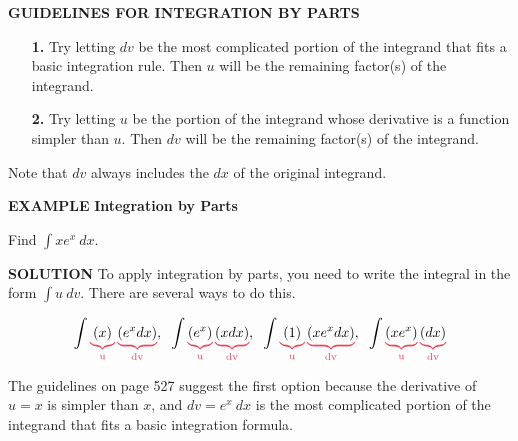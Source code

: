 \documentclass[oneside]{book}
\begin{document}
\sffamily
\begin{tcolorbox}[colback = beige!75!white,
				  sharp corners = all,
				  colframe = beige!75!white]
\textbf{GUIDELINES FOR INTEGRATION BY PARTS}
\rmfamily
\begin{enumerate}
\item[\textbf{1.}] Try letting $dv$ be the most complicated portion of the integrand that fits a basic integration rule. Then $u$ will be the remaining factor(s) of the integrand.

\item[\textbf{2.}] Try letting $u$ be the portion of the integrand whose derivative is a function simpler than $u$. Then $dv$ will be the remaining factor(s) of the integrand.
\end{enumerate}

\noindent Note that $dv$ always includes the $dx$ of the original integrand. 
\end{tcolorbox}

\bigskip

\noindent \color{myblue} \large \textbf{EXAMPLE} \color{black} \normalsize \textbf{Integration by Parts}
\rmfamily

\bigskip

\noindent Find $ \displaystyle \int xe^x \ dx$.
\sffamily

\bigskip

\noindent \color{myblue} \textbf{SOLUTION} \color{black} \rmfamily \hspace{.3cm}To apply integration by parts, you need to write the integral in the form $\int u \ dv$. There are several ways to do this.

$$ \int \color{mypink}\underbrace{\color{black}(x)}_\text{u} \color{mypink}\underbrace{\color{black}(e^x dx)}_\text{dv}\color{black}, 
\hspace{.2cm} \int \color{mypink}\underbrace{\color{black}(e^x)}_\text{u} \color{mypink}\underbrace{\color{black}(x dx)}_\text{dv}\color{black}, 
\hspace{.2cm}  \int \color{mypink}\underbrace{\color{black}(1)}_\text{u} \color{mypink}\underbrace{\color{black}(xe^x dx)}_\text{dv}\color{black}, 
\hspace{.2cm} \int \color{mypink}\underbrace{\color{black}(x e^x)}_\text{u} \color{mypink}\underbrace{\color{black}(dx)}_\text{dv} $$

\noindent The guidelines on page 527 suggest the first option because the derivative of $u = x$ is simpler than $x$, and $dv = e^x \ dx$ is the most complicated portion of the integrand that fits a basic integration formula. 
\end{document}
